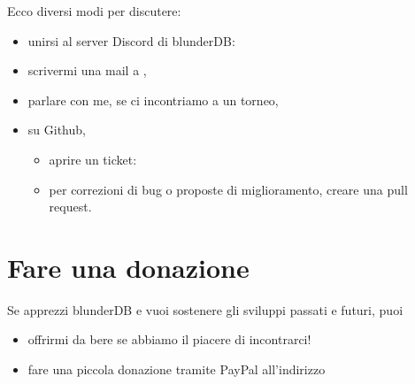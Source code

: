 \documentclass[letterpaper,10pt,italian]{sphinxmanual}
\begin{document}
\sphinxAtStartPar
Ecco diversi modi per discutere:
\begin{itemize}
\item {} 
\sphinxAtStartPar
unirsi al server Discord di blunderDB: 

\item {} 
\sphinxAtStartPar
scrivermi una mail a ,

\item {} 
\sphinxAtStartPar
parlare con me, se ci incontriamo a un torneo,

\item {} 
\sphinxAtStartPar
su Github,
\begin{itemize}
\item {} 
\sphinxAtStartPar
aprire un ticket: 

\item {} 
\sphinxAtStartPar
per correzioni di bug o proposte di miglioramento, creare una pull request.

\end{itemize}

\end{itemize}


\chapter{Fare una donazione}
\label{\detokenize{index:faire-un-don}}
\sphinxAtStartPar
Se apprezzi blunderDB e vuoi sostenere gli sviluppi passati e futuri, puoi
\begin{itemize}
\item {} 
\sphinxAtStartPar
offrirmi da bere se abbiamo il piacere di incontrarci!

\item {} 
\sphinxAtStartPar
fare una piccola donazione tramite PayPal all’indirizzo 

\end{itemize}
\end{document}
